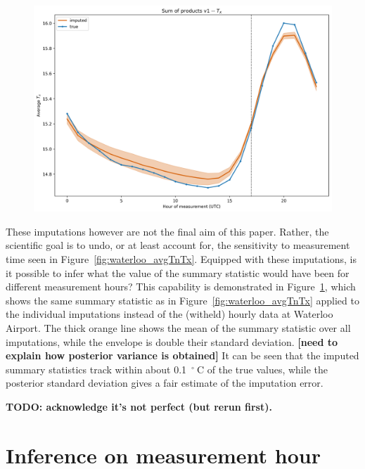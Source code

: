 \documentclass[letter]{article}
\makeatletter
\def\maxwidth{\ifdim\Gin@nat@width>\linewidth\linewidth
\else\Gin@nat@width\fi}
\let\Oldincludegraphics\includegraphics
\renewcommand{\includegraphics}[1]{\Oldincludegraphics[width=.8\maxwidth]{#1}}
\newcommand{\degreeC}{{}^{\circ}~\mathrm{C}}
\makeatother
\begin{document}
        \begin{figure}
\centering
\includegraphics{../figures/imputed_summary_stats.png}
\caption{\label{fig:imputed_summary_stats}}
\end{figure}
    


        These imputations however are not the final aim of this paper.
Rather, the scientific goal is to undo, or at least account for, the sensitivity to measurement time seen in Figure~\ref{fig:waterloo_avgTnTx}.
Equipped with these imputations, is it possible to infer what the value of the summary statistic would have been for different measurement hours?
This capability is demonstrated in Figure~\ref{fig:imputed_summary_stats},
which shows the same summary statistic as in Figure~\ref{fig:waterloo_avgTnTx} applied to the individual imputations instead of the (witheld) hourly data at Waterloo Airport.
The thick orange line shows the mean of the summary statistic over all imputations, while the envelope is double their standard deviation.
\textbf{{[}need to explain how posterior variance is obtained{]}}
It can be seen that the imputed summary statistics track within about 0.1~\(\degreeC\) of the true values,
while the posterior standard deviation gives a fair estimate of the imputation error.

\textbf{TODO: acknowledge it's not perfect (but rerun first).}
    


        \section{Inference on measurement hour}\label{inference-on-measurement-hour}
\end{document}
